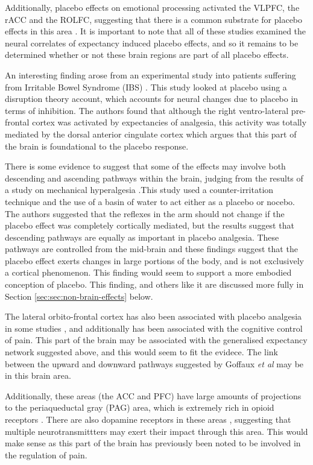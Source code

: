 Additionally, placebo effects on emotional processing activated the VLPFC, the rACC and the ROLFC, suggesting that there is a common substrate for placebo effects in this area \cite{Beauregard2007a}. It is important to note that all of these studies examined the neural correlates of expectancy induced placebo effects, and so it remains to be determined whether or not these brain regions are part of all placebo effects. 
 
An interesting finding arose from an experimental study into patients suffering from Irritable Bowel Syndrome (IBS) \cite{Lieberman2004}. This study looked at placebo using a disruption theory account, which accounts for neural changes due to placebo in terms of inhibition. The authors found that although the right ventro-lateral pre-frontal cortex was activated by expectancies of analgesia, this activity was totally mediated by the dorsal anterior cingulate cortex which argues that this part of the brain is foundational to the placebo response.  

There is some evidence to suggest that some of the effects may involve both descending and ascending pathways within the brain, judging from the results of a study on mechanical hyperalgesia \cite{Goffaux2007}.This study used a counter-irritation technique and the use of a basin of water to act either as a placebo or nocebo. The authors suggested that the reflexes in the arm should not change if the placebo effect was completely cortically mediated, but the results suggest that descending pathways are equally as important in placebo analgesia. These pathways are controlled from the mid-brain and these findings suggest that the placebo effect exerts changes in large portions of the body, and is not exclusively a cortical phenomenon. This finding would seem to support a more embodied conception of placebo. This finding, and others like it are discussed more fully in Section \ref{sec:sec:non-brain-effects} below.

The lateral orbito-frontal cortex has also been associated with placebo analgesia in some studies \cite{Petrovic2002}, and additionally has been associated with the cognitive control of pain. This part of the brain may be associated with the generalised expectancy network suggested above, and this would seem to fit the evidece. The link between the upward and downward pathways suggested by Goffaux \textit{et al} may be in this brain area. 

Additionally, these areas (the ACC and PFC) have large amounts of projections to the periaqueductal gray (PAG) area, which is extremely rich in opioid receptors  \cite{Colloca2008a}. There are also dopamine receptors in these areas \cite{Fuente-FernAndez2004}, suggesting that multiple neurotransmittters may exert their impact through this area. This would make sense as this part of the brain has previously been noted to be involved in the regulation of pain. 

